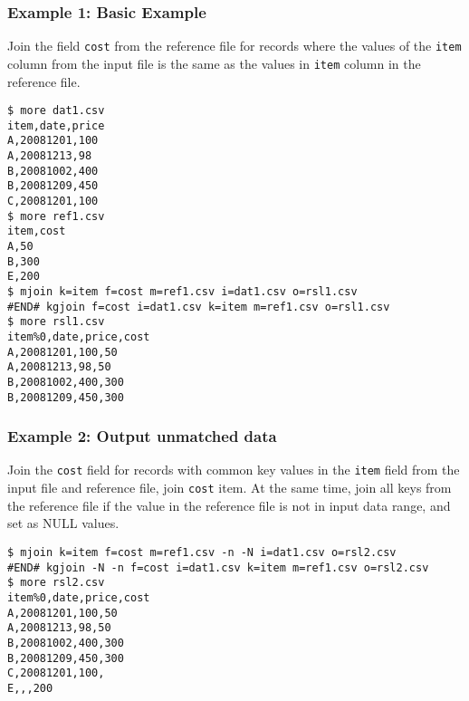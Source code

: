 \subsubsection*{Example 1: Basic Example}

Join the field \verb|cost| from the reference file for records where the values of the \verb|item| column from the input file is the same as the values in \verb|item| column in the reference file.


\begin{Verbatim}[baselinestretch=0.7,frame=single]
$ more dat1.csv
item,date,price
A,20081201,100
A,20081213,98
B,20081002,400
B,20081209,450
C,20081201,100
$ more ref1.csv
item,cost
A,50
B,300
E,200
$ mjoin k=item f=cost m=ref1.csv i=dat1.csv o=rsl1.csv
#END# kgjoin f=cost i=dat1.csv k=item m=ref1.csv o=rsl1.csv
$ more rsl1.csv
item%0,date,price,cost
A,20081201,100,50
A,20081213,98,50
B,20081002,400,300
B,20081209,450,300
\end{Verbatim}
\subsubsection*{Example 2: Output unmatched data}

Join the \verb|cost| field for records with common key values in the \verb|item| field from the input file and reference file, join \verb|cost| item. At the same time, join all keys from the reference file if the value in the reference file is not in input data range, and set as NULL values.


\begin{Verbatim}[baselinestretch=0.7,frame=single]
$ mjoin k=item f=cost m=ref1.csv -n -N i=dat1.csv o=rsl2.csv
#END# kgjoin -N -n f=cost i=dat1.csv k=item m=ref1.csv o=rsl2.csv
$ more rsl2.csv
item%0,date,price,cost
A,20081201,100,50
A,20081213,98,50
B,20081002,400,300
B,20081209,450,300
C,20081201,100,
E,,,200
\end{Verbatim}
